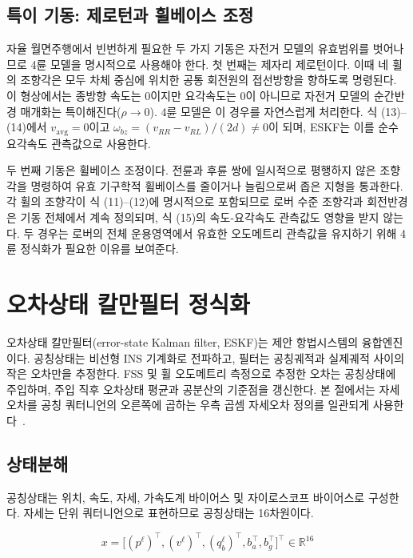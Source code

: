 \documentclass[]{IAC_style}
\begin{document}
\subsection{특이 기동: 제로턴과 휠베이스 조정}

자율 월면주행에서 빈번하게 필요한 두 가지 기동은 자전거 모델의 유효범위를 벗어나므로 4륜 모델을 명시적으로 사용해야 한다. 첫 번째는 제자리 제로턴이다. 이때 네 휠의 조향각은 모두 차체 중심에 위치한 공통 회전원의 접선방향을 향하도록 명령된다. 이 형상에서는 종방향 속도는 0이지만 요각속도는 0이 아니므로 자전거 모델의 순간반경 매개화는 특이해진다($\rho \to 0$). 4륜 모델은 이 경우를 자연스럽게 처리한다. 식 (13)–(14)에서 $v_{\mathrm{avg}} = 0$이고 $\omega_{bz} = (v_{RR} - v_{RL})/(2d) \neq 0$이 되며, ESKF는 이를 순수 요각속도 관측값으로 사용한다.

두 번째 기동은 휠베이스 조정이다. 전륜과 후륜 쌍에 일시적으로 평행하지 않은 조향각을 명령하여 유효 기구학적 휠베이스를 줄이거나 늘림으로써 좁은 지형을 통과한다. 각 휠의 조향각이 식 (11)–(12)에 명시적으로 포함되므로 로버 수준 조향각과 회전반경은 기동 전체에서 계속 정의되며, 식 (15)의 속도-요각속도 관측값도 영향을 받지 않는다. 두 경우는 로버의 전체 운용영역에서 유효한 오도메트리 관측값을 유지하기 위해 4륜 정식화가 필요한 이유를 보여준다.

\section{오차상태 칼만필터 정식화}

오차상태 칼만필터(error-state Kalman filter, ESKF)는 제안 항법시스템의 융합엔진이다. 공칭상태는 비선형 INS 기계화로 전파하고, 필터는 공칭궤적과 실제궤적 사이의 작은 오차만을 추정한다. FSS 및 휠 오도메트리 측정으로 추정한 오차는 공칭상태에 주입하며, 주입 직후 오차상태 평균과 공분산의 기준점을 갱신한다. 본 절에서는 자세오차를 공칭 쿼터니언의 오른쪽에 곱하는 우측 곱셈 자세오차 정의를 일관되게 사용한다~\cite{lefferts1982kalman,sola2017quaternion,sveinsson2012insgps}.

\subsection{상태분해}

공칭상태는 위치, 속도, 자세, 가속도계 바이어스 및 자이로스코프 바이어스로 구성한다. 자세는 단위 쿼터니언으로 표현하므로 공칭상태는 16차원이다.

\begin{equation*}
x=\bigl[(p^\ell)^{\top},(v^\ell)^{\top},(q_b^\ell)^{\top},b_a^{\top},b_g^{\top}\bigr]^{\top}\in\mathbb{R}^{16}
\end{equation*}
\end{document}
